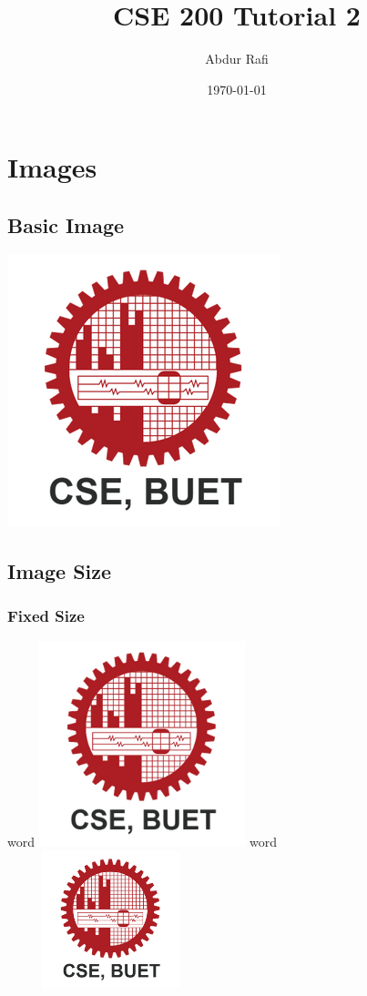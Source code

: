 \documentclass{article}
\title{CSE 200 Tutorial 2}
\author{Abdur Rafi}
\date{\today}
\begin{document}
\maketitle
\tableofcontents
\listoffigures

\pagebreak

\section{Images}

\subsection{Basic Image}

\includegraphics{Images/CSE_BUET.png}

\pagebreak


\subsection{Image Size}

\subsubsection{Fixed Size}
word
\includegraphics[width=6cm]{Images/CSE_BUET.png}
word
\includegraphics[width=6cm, height=4cm]{Images/CSE_BUET.png}
\end{document}
